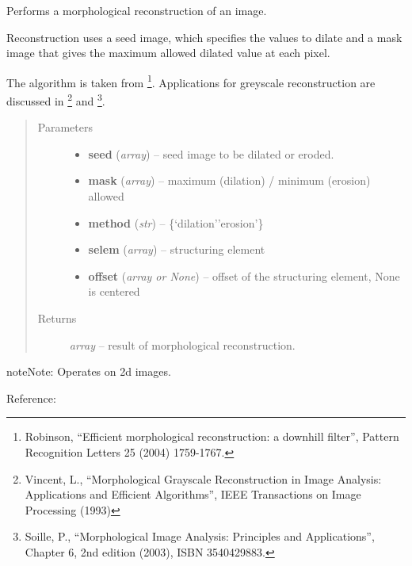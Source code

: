 \documentclass[letterpaper,10pt,english]{sphinxmanual}
\begin{document}
\begin{fulllineitems}
\label{api/ClearMap.ImageProcessing:ClearMap.ImageProcessing.GreyReconstruction.reconstruct}
Performs a morphological reconstruction of an image.

Reconstruction uses a seed image, which specifies the values
to dilate and a mask image that gives the maximum allowed dilated value at
each pixel.

The algorithm is taken from \footnote[1]{
Robinson, ``Efficient morphological reconstruction: a downhill
filter'', Pattern Recognition Letters 25 (2004) 1759-1767.
}. Applications for greyscale
reconstruction are discussed in \footnote[2]{
Vincent, L., ``Morphological Grayscale Reconstruction in Image
Analysis: Applications and Efficient Algorithms'', IEEE Transactions
on Image Processing (1993)
} and \footnote[3]{
Soille, P., ``Morphological Image Analysis: Principles and
Applications'', Chapter 6, 2nd edition (2003), ISBN 3540429883.
}.
\begin{quote}\begin{description}
\item[{Parameters}] \leavevmode\begin{itemize}
\item {} 
\textbf{seed} (\emph{array}) --
seed image to be dilated or eroded.

\item {} 
\textbf{mask} (\emph{array}) --
maximum (dilation) / minimum (erosion) allowed

\item {} 
\textbf{method} (\emph{str}) --
\{`dilation'\textbar{}'erosion'\}

\item {} 
\textbf{selem} (\emph{array}) --
structuring element

\item {} 
\textbf{offset} (\emph{array or None}) --
offset of the structuring element, None is centered

\end{itemize}

\item[{Returns}] \leavevmode
\emph{array} --
result of morphological reconstruction.

\end{description}\end{quote}

\begin{notice}{note}{Note:}
Operates on 2d images.
\end{notice}

Reference:

\end{fulllineitems}
\end{document}
